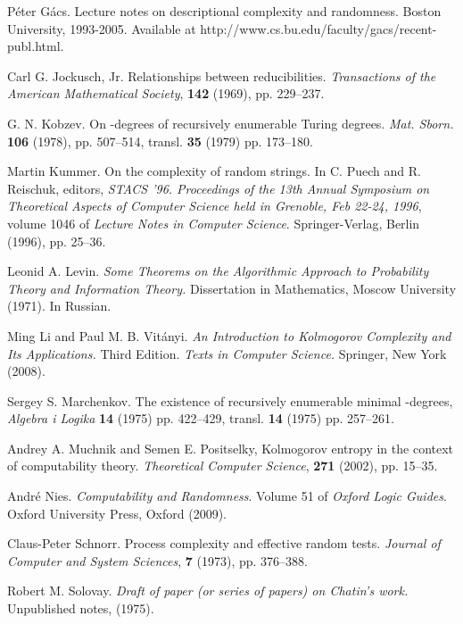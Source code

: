 \documentclass{LMCS}
\newcommand{\0}{\mathbf{0}}
\newcommand{\<}{\langle}
\renewcommand{\>}{\rangle}
\begin{document}
\begin{thebibliography}{99}
  P\'eter G\'acs.
  Lecture notes on descriptional complexity and randomness.
  Boston University, 1993-2005.
  Available at http://www.cs.bu.edu/faculty/gacs/recent-publ.html.

  Carl G. Jockusch, Jr.
  Relationships between reducibilities.
  {\em Transactions of the American Mathematical Society},
  {\bf 142} (1969), pp. 229--237.

  G. N. Kobzev.
  On -degrees of recursively enumerable Turing degrees.
  {\em Mat. Sborn.} {\bf 106} (1978), pp. 507--514,
  transl. {\bf 35} (1979) pp. 173--180.

  Martin Kummer.
  On the complexity of random strings.
  In C. Puech and R. Reischuk, editors, {\em STACS '96.
  Proceedings of the 13th Annual Symposium on Theoretical Aspects of
  Computer Science held in Grenoble, Feb 22-24, 1996},
  volume 1046 of {\em Lecture Notes in Computer Science}.
  Springer-Verlag, Berlin (1996), pp. 25--36.

  Leonid A. Levin.
  {\em Some Theorems on the Algorithmic Approach to Probability Theory and
  Information Theory.}  Dissertation in Mathematics, Moscow University (1971).
  In Russian.

  Ming Li and Paul M. B. Vit\'anyi.
  {\em An Introduction to {K}olmogorov Complexity and Its Applications.}
  Third Edition.
  {\em Texts in Computer Science.}
  Springer, New York (2008).

  Sergey S. Marchenkov.
  The existence of recursively enumerable minimal -degrees,
  {\em Algebra i Logika} {\bf 14} (1975) pp. 422--429,
  transl. {\bf 14} (1975) pp. 257--261.

Andrey A. Muchnik and Semen E. Positselky,
  Kolmogorov entropy in the context of computability theory.
  {\em Theoretical Computer Science}, {\bf 271} (2002), pp. 15--35.

  Andr\'e Nies.
  {\em Computability and Randomness}.
  Volume 51 of {\em Oxford Logic Guides}.
  Oxford University Press, Oxford (2009).

  Claus-Peter Schnorr.
  Process complexity and effective random tests.
  {\em Journal of Computer and System Sciences}, {\bf 7} (1973), pp. 376--388.

  Robert M. Solovay.
  {\em Draft of paper (or series of papers) on Chatin's work.}
  Unpublished notes, (1975).

\end{thebibliography}
\end{document}
